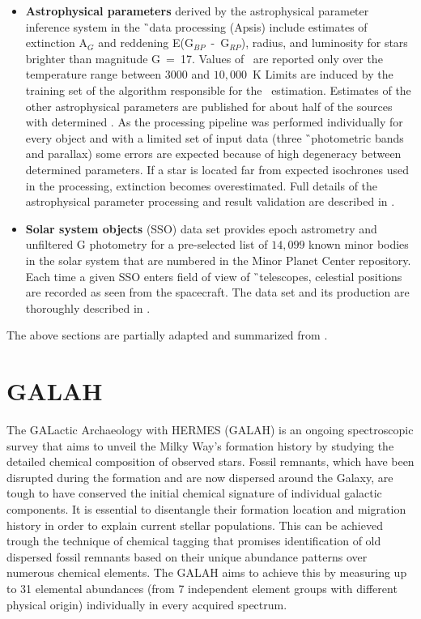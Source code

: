 \begin{itemize}
	\item \textbf{Astrophysical parameters} derived by the astrophysical parameter inference system in the \G\ data processing (Apsis) include estimates of \Teff\, extinction A$_G$ and reddening E(G$_{BP}$~-~G$_{RP}$), radius, and luminosity for stars brighter than magnitude G~=~17. Values of \Teff\ are reported only over the temperature range between $3000$ and $10,000$~K Limits are induced by the training set of the algorithm responsible for the \Teff\ estimation. Estimates of the other astrophysical parameters are published for about half of the sources with determined \Teff. As the processing pipeline was performed individually for every object and with a limited set of input data (three \G\ photometric bands and parallax) some errors are expected because of high degeneracy between determined parameters. If a star is located far from expected isochrones used in the processing, extinction becomes overestimated. Full details of the astrophysical parameter processing and result validation are described in \citet{2018A&A...616A...8A}.	
	
	\item \textbf{Solar system objects} (SSO) data set provides epoch astrometry and unfiltered G photometry for a pre-selected list of $14,099$ known minor bodies in the solar system that are numbered in the Minor Planet Center repository. Each time a given SSO enters field of view of \G\ telescopes, celestial positions are recorded as seen from the spacecraft. The data set and its production are thoroughly described in \citet{2018A&A...616A..13G}.
	
\end{itemize}

The above sections are partially adapted and summarized from \citet{2016A&A...595A...1G, 2018arXiv180409365G, gaia_primer}.

\section{GALAH}
\label{sec:galah_data}
The GALactic Archaeology with HERMES (GALAH) \citep{2015MNRAS.449.2604D} is an ongoing spectroscopic survey that aims to unveil the Milky Way’s formation history by studying the detailed chemical composition of observed stars. Fossil remnants, which have been disrupted during the formation and are now dispersed around the Galaxy, are tough to have conserved the initial chemical signature of individual galactic components. It is essential to disentangle their formation location and migration history in order to explain current stellar populations. This can be achieved trough the technique of chemical tagging \citep{2002ARA&A..40..487F} that promises identification of old dispersed fossil remnants based on their unique abundance patterns over numerous chemical elements. The GALAH aims to achieve this by measuring up to 31 elemental abundances (from 7 independent element groups with different physical origin) individually in every acquired spectrum.

